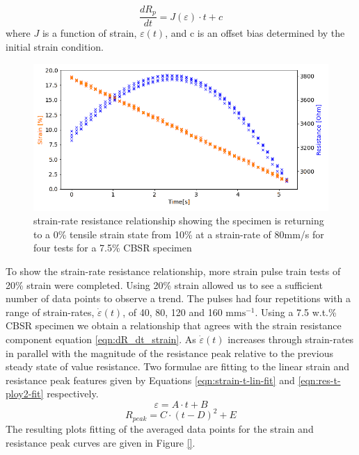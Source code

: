 \begin{equation} 
	\frac{dR_p}{dt} = J(\varepsilon) \cdot t + c
	\label{eqn:dR_dt_strain}
\end{equation}
where $J$ is a function of strain, $\varepsilon(t)$, and c is an offset bias determined by the initial strain condition.
\begin{figure}[H]
	\centering
	\includegraphics[width=0.7\linewidth]{Figures/strain_velocity_res_80mms_2_7-5_E4pin_20mm_v11_0.2Strain_velocityprof.png}
	\caption{strain-rate resistance relationship showing the specimen is returning to a 0\% tensile strain state from 10\% at a strain-rate of 80mm/s for four tests for a 7.5\% CBSR specimen}
	\label{fig:poly2_r_strain}
\end{figure}
To show the strain-rate resistance relationship, more strain pulse train tests of 20\% strain were completed. Using 20\% strain allowed us to see a sufficient number of data points to observe a trend. The pulses had four repetitions with a range of strain-rates, $\dot{\varepsilon}(t)$, of 40, 80, 120 and 160 $\mathrm{mms^{-1}}$. Using a 7.5 w.t.\% CBSR specimen we obtain a relationship that agrees with the strain resistance component equation \ref{eqn:dR_dt_strain}. As $\dot{\varepsilon}(t)$ increases through strain-rates in parallel with the magnitude of the resistance peak relative to the previous steady state of value resistance. Two formulae are fitting to the linear strain and resistance peak features given by Equations \ref{eqn:strain-t-lin-fit} and \ref{eqn:res-t-ploy2-fit} respectively.
\begin{equation}
	\varepsilon = A \cdot t + B
	\label{eqn:strain-t-lin-fit}
\end{equation}
\begin{equation}
	R_{peak} = C \cdot (t - D)^2 + E
	\label{eqn:res-t-ploy2-fit}
\end{equation}
The resulting plots fitting of the averaged data points for the strain and resistance peak curves are given in Figure \ref{}.
